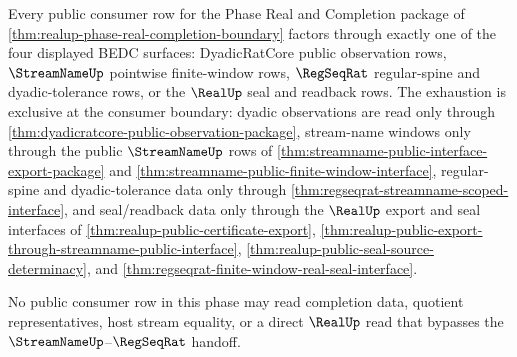 \begin{theorem}
\label{thm:realup-completion-phase-interface-exhaustion}
Every public consumer row for the Phase Real and Completion package of
\autoref{thm:realup-phase-real-completion-boundary} factors through exactly one
of the four displayed BEDC surfaces: DyadicRatCore public observation rows,
$\StreamNameUp$ pointwise finite-window rows, $\RegSeqRat$ regular-spine and
dyadic-tolerance rows, or the $\RealUp$ seal and readback rows. The exhaustion
is exclusive at the consumer boundary: dyadic observations are read only
through \autoref{thm:dyadicratcore-public-observation-package},
stream-name windows only through the public $\StreamNameUp$ rows of
\autoref{thm:streamname-public-interface-export-package} and
\autoref{thm:streamname-public-finite-window-interface}, regular-spine and
dyadic-tolerance data only through
\autoref{thm:regseqrat-streamname-scoped-interface}, and seal/readback data
only through the $\RealUp$ export and seal interfaces of
\autoref{thm:realup-public-certificate-export},
\autoref{thm:realup-public-export-through-streamname-public-interface},
\autoref{thm:realup-public-seal-source-determinacy}, and
\autoref{thm:regseqrat-finite-window-real-seal-interface}.

No public consumer row in this phase may read completion data, quotient
representatives, host stream equality, or a direct $\RealUp$ read that bypasses
the $\StreamNameUp$--$\RegSeqRat$ handoff.
\end{theorem}
